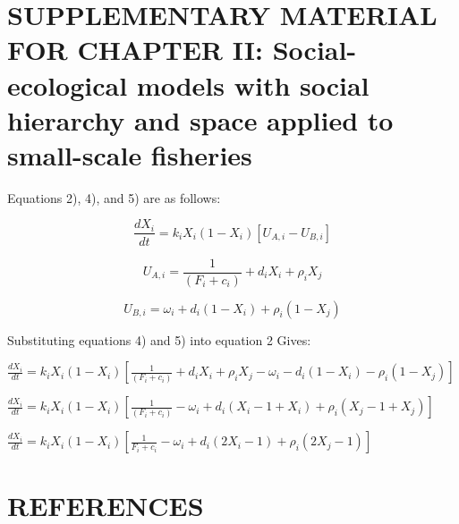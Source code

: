 \documentclass[
]{article}
\begin{document}
\newpage

\hypertarget{supplementary-material-for-chapter-ii-social-ecological-models-with-social-hierarchy-and-space-applied-to-small-scale-fisheries}{%
\section{SUPPLEMENTARY MATERIAL FOR CHAPTER II: Social-ecological models with social hierarchy and space applied to small-scale fisheries}\label{supplementary-material-for-chapter-ii-social-ecological-models-with-social-hierarchy-and-space-applied-to-small-scale-fisheries}}

Equations 2), 4), and 5) are as follows:

\begin{equation}
\tag{2}
\frac{dX_i}{dt} = k_iX_i(1-X_i)[U_{A,i} - U_{B,i}]
\end{equation}

\begin{equation}
\tag{4}
U_{A,i} = \frac{1}{(F_i + c_i)} + d_iX_i + \rho_i X_j
\end{equation}

\begin{equation}
\tag{5}
U_{B,i} = \omega_i + d_i(1-X_i) + \rho_i(1-X_j)
\end{equation}

Substituting equations 4) and 5) into equation 2 Gives:

\(\frac{dX_i}{dt} = k_iX_i(1-X_i)[\frac{1}{(F_i + c_i)} + d_iX_i + \rho_i X_j - \omega_i - d_i(1-X_i) - \rho_i(1-X_j)]\)

\(\frac{dX_i}{dt} = k_iX_i(1-X_i)[\frac{1}{(F_i + c_i)} - \omega_i + d_i(X_i-1+X_i) + \rho_i(X_j-1+X_j)]\)

\(\frac{dX_i}{dt} = k_iX_i(1-X_i) [\frac{1}{F_i+c_i} - \omega_i + d_i(2X_i - 1) + \rho_i(2X_j - 1)]\)

\newpage

\hypertarget{references}{%
\section{REFERENCES}\label{references}}

\singlespacing
\end{document}
